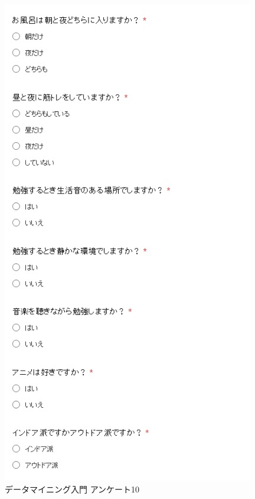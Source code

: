 \begin{figure}[p]
\centering
\includegraphics[width=11cm]{forms13.PNG}
\caption{データマイニング入門 アンケート10}\label{サンプル図}
\end{figure}

